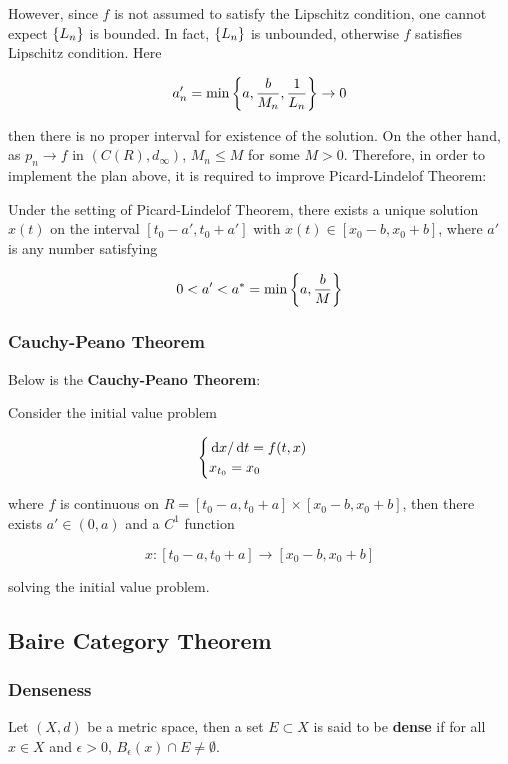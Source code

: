 \documentclass[a4paper,12pt]{article}
\begin{document}
However, since $f$ is not assumed to satisfy the Lipschitz condition, one cannot expect $\left\{ L_{n}\right\}$ is bounded. In fact, $\left\{ L_{n}\right\}$ is unbounded, otherwise $f$ satisfies Lipschitz condition. Here

$$a'_{n}=\min\left\{ a,\frac{b}{M_{n}},\frac{1}{L_{n}}\right\}\to 0$$\s

then there is no proper interval for existence of the solution. On the other hand, as $p_{n}\to f$ in $(C(R),d_{\infty})$, $M_{n}\leq M$ for some $M>0$. Therefore, in order to implement the plan above, it is required to improve Picard-Lindelof Theorem:\n

\begin{pst}
  Under the setting of Picard-Lindelof Theorem, there exists a unique solution $x(t)$ on the interval $[t_{0}-a',t_{0}+a']$ with $x(t)\in[x_{0}-b,x_{0}+b]$, where $a'$ is any number satisfying

  $$0<a'<a^{*}=\min\left\{ a,\frac{b}{M}\right\}$$
\end{pst}

\subsubsection{Cauchy-Peano Theorem}
Below is the \textbf{Cauchy-Peano Theorem}:\n

\begin{thm}
  Consider the initial value problem

  $$\begin{cases}
    \,\mathrm{d} x/\,\mathrm{d} t=f(t,x)\\
    x_{t_{0}}=x_{0}
  \end{cases}$$\s

  where $f$ is continuous on $R=[t_{0}-a,t_{0}+a]\times[x_{0}-b,x_{0}+b]$, then there exists $a'\in(0,a)$ and a $C^{1}$ function

  $$x:[t_{0}-a,t_{0}+a]\to[x_{0}-b,x_{0}+b]$$\s

  solving the initial value problem.
\end{thm}

\subsection{Baire Category Theorem}
\subsubsection{Denseness}
\begin{dft}
  Let $(X,d)$ be a metric space, then a set $E\subset X$ is said to be \textbf{dense} if for all $x\in X$ and $\epsilon>0$, $B_{\epsilon}(x)\cap E\neq\emptyset$.
\end{dft}\n
\end{document}
